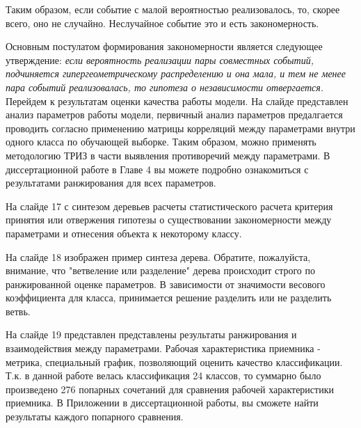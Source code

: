 \documentclass[review]{elsarticle}
\begin{document}
Таким образом, если событие с малой вероятностью реализовалось, то, скорее всего, оно не случайно. Неслучайное событие это и есть закономерность.

Основным постулатом формирования закономерности является следующее утверждение: \textit{если вероятность реализации пары совместных событий, подчиняется гипергеометрическому распределению и она мала, и тем не менее пара событий реализовалась, то гипотеза о независимости отвергается.}\\

Перейдем к результатам оценки качества работы модели.
На слайде представлен анализ параметров работы модели, первичный анализ параметров предалгается проводить согласно применению матрицы корреляций между параметрами внутри одного класса по обучающей выборке. Таким образом, можно применять методологию ТРИЗ в части выявления противоречий между параметрами.  
В диссертационной работе в Главе 4 вы можете подробно ознакомиться с результатами ранжирования для всех параметров.

На слайде 17 с синтезом деревьев расчеты статистического расчета критерия принятия или отвержения гипотезы о существовании закономерности между параметрами и отнесения объекта к некоторому классу.

На слайде 18 изображен пример синтеза дерева. Обратите, пожалуйста, внимание, что "ветвеление или разделение" дерева происходит строго по ранжированной оценке параметров. В зависимости от значимости весового коэффициента для класса, принимается решение разделить или не разделить ветвь.

На слайде 19 представлен представлены результаты ранжирования и взаимодействия между параметрами. Рабочая характеристика приемника - метрика, специальный график, позволяющий оценить качество классификации. Т.к. в данной работе велась классификация 24 классов, то суммарно было произведено 276 попарных сочетаний для сравнения рабочей характеристики приемника. В Приложении в диссертационной работы, вы сможете найти результаты каждого попарного сравнения.
\end{document}

